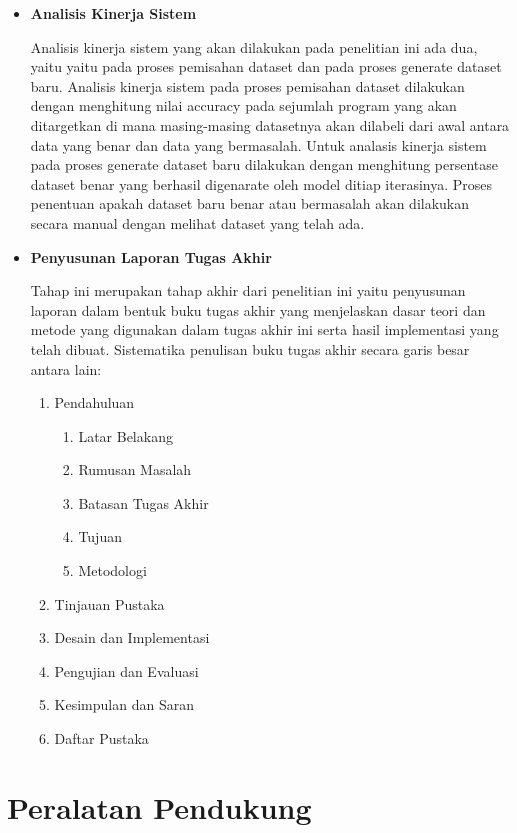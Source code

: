 \begin{itemize}[topsep=0pt]
  \item \textbf{Analisis Kinerja Sistem}
  
  Analisis kinerja sistem yang akan dilakukan pada penelitian ini ada dua, yaitu yaitu pada proses pemisahan dataset dan pada proses generate dataset baru. Analisis kinerja sistem pada proses pemisahan dataset dilakukan dengan menghitung nilai accuracy pada sejumlah program yang akan ditargetkan di mana masing-masing datasetnya akan dilabeli dari awal antara data yang benar dan data yang bermasalah. Untuk analasis kinerja sistem pada proses generate dataset baru dilakukan dengan menghitung persentase dataset benar yang berhasil digenarate oleh model ditiap iterasinya. Proses penentuan apakah dataset baru benar atau bermasalah akan dilakukan secara manual dengan melihat dataset yang telah ada.

  \item \textbf{Penyusunan Laporan Tugas Akhir}
  
  Tahap ini merupakan tahap akhir dari penelitian ini yaitu penyusunan laporan dalam bentuk buku tugas akhir yang menjelaskan dasar teori dan metode yang digunakan dalam tugas akhir ini serta hasil implementasi yang telah dibuat. Sistematika penulisan buku tugas akhir secara garis besar antara lain:

  \begin{enumerate}[topsep=0pt]
    \item Pendahuluan
    \begin{enumerate}[topsep=0pt]
      \item Latar Belakang
      \item Rumusan Masalah
      \item Batasan Tugas Akhir
      \item Tujuan
      \item Metodologi
    \end{enumerate}
    \item Tinjauan Pustaka
    \item Desain dan Implementasi
    \item Pengujian dan Evaluasi
    \item Kesimpulan dan Saran
    \item Daftar Pustaka
  \end{enumerate}
\end{itemize}

\section{Peralatan Pendukung}
\label{sec:peralatan pendukung}


